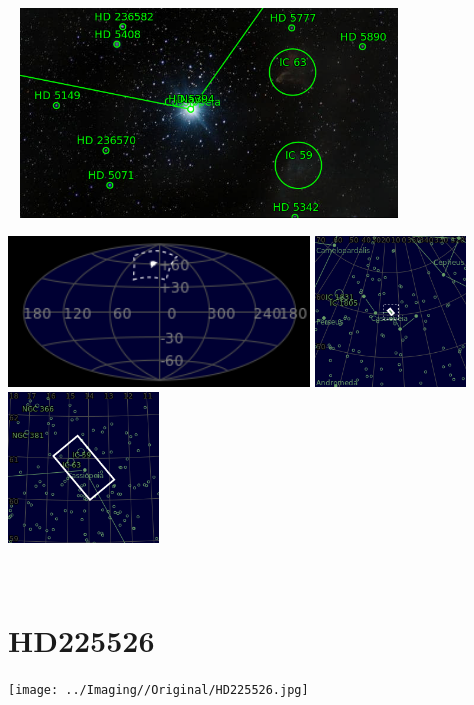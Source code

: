 \begin{center}
 \ \newpage
\includegraphics[width=0.75\textwidth]{../Imaging//Annotated/Ghost_Of_Cassiopeia_Annotated.jpg}

\includegraphics[height=4cm]{../Imaging//Annotated/Ghost_Of_Cassiopeia_Globe.jpg}
\includegraphics[height=4cm]{../Imaging//Annotated/Ghost_Of_Cassiopeia_Close.jpg}
\includegraphics[height=4cm]{../Imaging//Annotated/Ghost_Of_Cassiopeia_Closer.jpg}
\end{center}
\ \\\section{HD225526}
\texttt{[image: ../Imaging//Original/HD225526.jpg]}
{\footnotesize\color{white}


}\ \\
